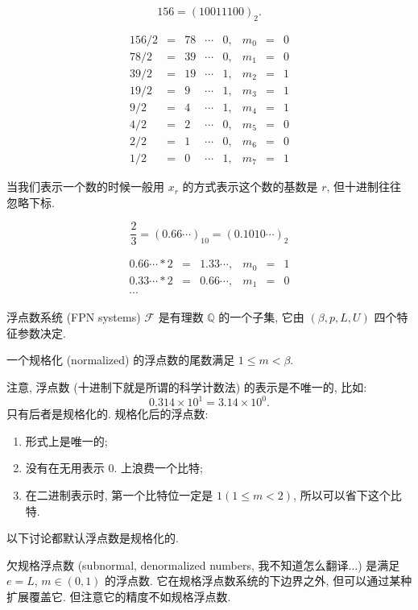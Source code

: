 \documentclass[a4paper]{ctexart}
\begin{document}
{
$$
156 = (10011100)_2.
$$

$$
\begin{array}{rclclrcl}
  156 / 2 &=& 78 &\cdots& 0,& m_0 &=& 0 \\
  78 / 2 &=& 39 &\cdots& 0,& m_1 &=& 0 \\
  39 / 2 &=& 19 &\cdots& 1,& m_2 &=& 1\\
  19 / 2 &=& 9 &\cdots& 1,& m_3 &=& 1\\
  9 / 2 &=& 4 &\cdots& 1,& m_4 &=& 1\\
  4 / 2 &=& 2 &\cdots& 0,& m_5 &=& 0\\
  2 / 2 &=& 1 &\cdots& 0,& m_6 &=& 0\\
  1 / 2 &=& 0 &\cdots& 1,& m_7 &=& 1
\end{array}
$$

当我们表示一个数的时候一般用 $x_r$ 的方式表示这个数的基数是 $r$,
但十进制往往忽略下标.

$$
\frac{2}{3} = (0.66\cdots)_{10} = (0.1010\cdots)_2
$$

$$
\begin{array}{rclrcl}
  0.66\cdots * 2 &=& 1.33\cdots, & m_0 &=& 1 \\
  0.33\cdots * 2 &=& 0.66\cdots, & m_1 &=& 0 \\
  \cdots&&&&&
\end{array}
$$

 浮点数系统 (FPN systems) $\mathscr{F}$ 是有理数
$\mathbb{Q}$ 的一个子集, 它由 $(\beta, p, L, U)$ 四个特征参数决定.

 一个规格化 (normalized) 的浮点数的尾数满足
$1 \leq m < \beta$.

注意, 浮点数 (十进制下就是所谓的科学计数法) 的表示是不唯一的, 比如:
$$
0.314 \times 10^1 = 3.14 \times 10^0.
$$
只有后者是规格化的. 规格化后的浮点数:
\begin{enumerate}
\item 形式上是唯一的;
\item 没有在无用表示 $0.$ 上浪费一个比特;
\item 在二进制表示时, 第一个比特位一定是 $1(1 \leq m < 2)$,
  所以可以省下这个比特.
\end{enumerate}
以下讨论都默认浮点数是规格化的.

 欠规格浮点数 (subnormal, denormalized numbers,
我不知道怎么翻译...) 是满足 $e = L$, $m \in (0, 1)$ 的浮点数.
它在规格浮点数系统的下边界之外, 但可以通过某种扩展覆盖它.
但注意它的精度不如规格浮点数.

}
\end{document}
